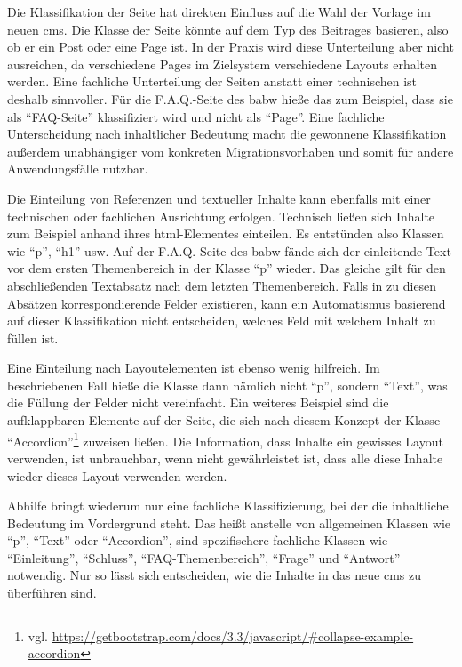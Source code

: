         Die Klassifikation der Seite hat direkten Einfluss auf die Wahl der Vorlage im neuen \gls{cms}.
        Die Klasse der Seite könnte auf dem Typ des Beitrages basieren,
        also ob er ein Post oder eine Page ist.
        In der Praxis wird diese Unterteilung aber nicht ausreichen,
        da verschiedene Pages im Zielsystem verschiedene Layouts erhalten werden.
        Eine fachliche Unterteilung der Seiten anstatt einer technischen ist deshalb sinnvoller.
        Für die F.A.Q.-Seite des \gls{babw} hieße das zum Beispiel,
        dass sie als "`FAQ-Seite"' klassifiziert wird und nicht als "`Page"'.
        Eine fachliche Unterscheidung nach inhaltlicher Bedeutung macht die
        gewonnene Klassifikation außerdem unabhängiger vom konkreten
        Migrationsvorhaben und somit für andere Anwendungsfälle nutzbar.

        Die Einteilung von Referenzen und textueller Inhalte kann ebenfalls
        mit einer technischen oder fachlichen Ausrichtung erfolgen.
        Technisch ließen sich Inhalte zum Beispiel anhand ihres \gls{html}-Elementes einteilen.
        Es entstünden also Klassen wie "`p"', "`h1"' usw.
        Auf der F.A.Q.-Seite des \gls{babw} fände sich der einleitende Text vor dem
        ersten Themenbereich in der Klasse "`p"' wieder.
        Das gleiche gilt für den abschließenden Textabsatz nach dem letzten Themenbereich.
        Falls in {\imperia} zu diesen Absätzen
        korrespondierende Felder existieren, kann ein Automatismus basierend auf dieser
        Klassifikation nicht entscheiden, welches Feld mit welchem Inhalt zu füllen ist.
        
        Eine Einteilung nach Layoutelementen ist ebenso wenig hilfreich.
        Im beschriebenen Fall hieße die Klasse dann nämlich nicht "`p"',
        sondern "`Text"', was die Füllung der Felder nicht vereinfacht.
        Ein weiteres Beispiel sind die aufklappbaren Elemente auf der Seite,
        die sich nach diesem Konzept
        der Klasse "`Accordion"'\footnote{vgl. \url{https://getbootstrap.com/docs/3.3/javascript/\#collapse-example-accordion}}
        zuweisen ließen.
        Die Information, dass Inhalte ein gewisses Layout verwenden,
        ist unbrauchbar, wenn nicht gewährleistet ist,
        dass alle diese Inhalte wieder dieses Layout verwenden werden.

        Abhilfe bringt wiederum nur eine fachliche Klassifizierung,
        bei der die inhaltliche Bedeutung im Vordergrund steht.
        Das heißt anstelle von allgemeinen Klassen wie "`p"', "`Text"'
        oder "`Accordion"', sind spezifischere fachliche Klassen wie
        "`Einleitung"', "`Schluss"', "`FAQ-Themenbereich"', "`Frage"' und "`Antwort"'
        notwendig.
        Nur so lässt sich entscheiden, wie die Inhalte in das neue \gls{cms}
        zu überführen sind.

